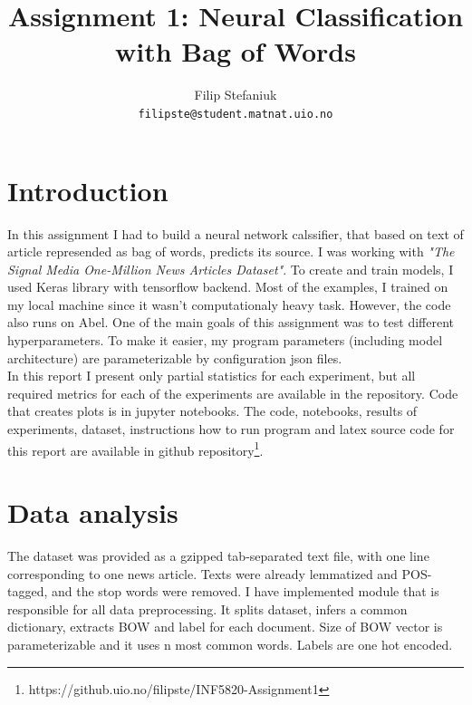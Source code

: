 \documentclass{article}
\title{Assignment 1: Neural Classification\\ with Bag of Words} %
\author{Filip Stefaniuk\\ \texttt{filipste@student.matnat.uio.no}} %
\begin{document}
\maketitle %


\section{Introduction}
In this assignment I had to build a neural network calssifier, that based on text of article
represended as bag of words, predicts its source. I was working with \textit{"The Signal Media One-Million News Articles Dataset"}.
To create and train models, I used Keras library with tensorflow backend. Most of the examples,
I trained on my local machine since it wasn't computationaly heavy task. However, the code also runs
on Abel. One of the main goals of this assignment was to test different hyperparameters. To make it easier,
my program parameters (including model architecture) are parameterizable by configuration json files. \\
In this report I present only partial statistics for each experiment, but all required metrics 
for each of the experiments are available in the repository.
Code that creates plots is in jupyter notebooks. 
The code, notebooks, results of experiments,
dataset, instructions how to run program and latex source code for this report are available in
github repository\footnote{https://github.uio.no/filipste/INF5820-Assignment1}.


\section{Data analysis} %

The dataset was provided as a gzipped tab-separated text file,
with one line corresponding to one news article. Texts were already lemmatized and POS-tagged,
and the stop words were removed. I have implemented module that is
responsible for all data preprocessing. It splits dataset, infers a common dictionary, extracts
BOW and label for each document. Size of BOW vector is parameterizable and it uses n
most common words. Labels are one hot encoded. 
\end{document}
